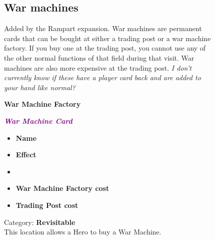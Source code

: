 \begin{figure}[h]
  \begin{minipage}[t]{0.5\textwidth}
    \vspace{0pt}
    \subsection*{War machines}
    Added by the Rampart expansion.
    War machines are permanent cards that can be bought at either a trading post or a war machine factory.
    If you buy one at the trading post, you cannot use any of the other normal functions of that field during that visit.
    War machines are also more expensive at the trading post.
    \textit{I don't currently know if these have a player card back and are added to your hand like normal?}\par
    \smallskip
    \textbf{War Machine Factory}\\
      \caption{\scriptsize Category: \scriptsize\textbf{Revisitable}\\This location allows a Hero to buy a War Machine.}
  \end{minipage}
  \begin{minipage}[t]{0.4\textwidth}
    \vspace{0pt}
    \centering
    \begin{scriptsize}
    \end{scriptsize}
    \break
    \footnotesize{\textbf{\textit{\textcolor{purple}{War Machine Card}}}}
    \scriptsize
    \begin{multicols}{2}
      \begin{itemize}
        \item[\textbf{1.}] \textbf{Name}
        \item[\textbf{2.}] \textbf{Effect}
        \item[\textbf{\phantom{.}}] \phantom{.}
        \item[\textbf{3.}] \textbf{War Machine Factory cost}
        \item[\textbf{4.}] \textbf{Trading Post cost}
      \end{itemize}
    \end{multicols}
  \end{minipage}
\end{figure}

